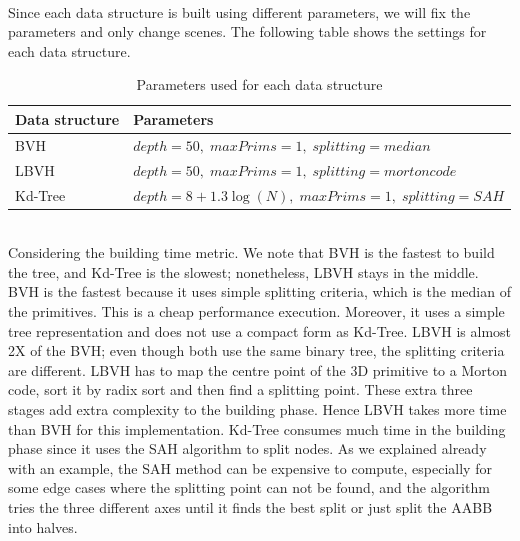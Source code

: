 \documentclass[11pt,a4paper]{article}
\begin{document}
\noindent
\\
Since each data structure is built using different parameters, we will fix the parameters and only change scenes. The following table shows the settings for each data structure.

\begin{table}[H] 
\centering 
{\footnotesize
\begin{tabular}{ P{7cm} P{7cm} }      %
\hline \hline
Data structure & Parameters \T\B  \\
\hline \hline
BVH & $depth=50,\; maxPrims=1,\; splitting=median$\T\B
\\    
\hline
LBVH & $depth=50,\; maxPrims=1,\; splitting=morton code$ \T\B
\\
 \hline
Kd-Tree & $depth = 8 + 1.3\log(N),\; maxPrims=1,\; splitting=SAH$ \T\B 
\\ 
\hline \hline
    \end{tabular}
}
  \caption{Parameters used for each data structure}
\end{table}

\noindent
\\
Considering the building time metric. We note that BVH is the fastest to build the tree, and Kd-Tree is the slowest; nonetheless, LBVH stays in the middle. BVH is the fastest because it uses simple splitting criteria, which is the median of the primitives. This is a cheap performance execution. Moreover, it uses a simple tree representation and does not use a compact form as Kd-Tree. LBVH is almost 2X of the BVH; even though both use the same binary tree, the splitting criteria are different. LBVH has to map the centre point of the 3D primitive to a Morton code, sort it by radix sort and then find a splitting point. These extra three stages add extra complexity to the building phase. Hence LBVH takes more time than BVH for this implementation. Kd-Tree consumes much time in the building phase since it uses the SAH algorithm to split nodes. As we explained already with an example, the SAH method can be expensive to compute, especially for some edge cases where the splitting point can not be found, and the algorithm tries the three different axes until it finds the best split or just split the AABB into halves. 
\end{document}
